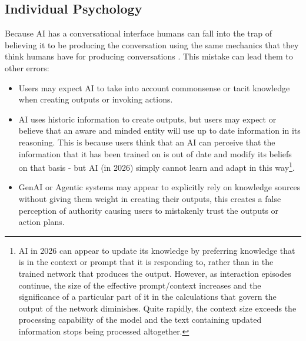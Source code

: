 \documentclass[11pt]{article}
\begin{document}
\subsection{Individual Psychology} Because AI has a conversational interface humans can fall into the trap of believing it to be producing the conversation using the same mechanics that they think humans have for producing conversations \citep{jacobs_artificial_2025,kirkeby-hinrup_psychology_2025,lee_whats_2019}. This mistake can lead them to other errors: 
\begin{itemize}
\item Users may expect AI to take into account commonsense or tacit knowledge when creating outputs or invoking actions.
\item AI uses historic information to create outputs, but users may expect or believe that an aware and minded entity will use up to date information in its reasoning. This is because users think that an AI can perceive that the information that it has been trained on is out of date and modify its beliefs on that basis - but AI (in 2026) simply cannot learn and adapt in this way\footnote{AI in 2026 can appear to update its knowledge by preferring knowledge that is in the context or prompt that it is responding to, rather than in the trained network that produces the output. However, as interaction episodes continue, the size of the effective prompt/context increases and the significance of a particular part of it in the calculations that govern the output of the network diminishes. Quite rapidly, the context size exceeds the processing capability of the model and the text containing updated information stops being processed altogether.}. 
\item GenAI or Agentic systems may appear to explicitly rely on knowledge sources without giving them weight in creating their outputs, this creates a false perception of authority causing users to mistakenly trust the outputs or action plans.
\end{itemize}
\end{document}
